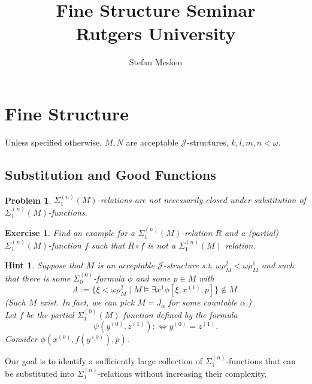\documentclass[12pt,a4paper]{article}
\theoremstyle{nicestyle}
\newtheorem{problem}{Problem}[subsection]
\newtheorem{hint}{Hint}[subsection]
\newtheorem{exercise}{Exercise}[subsection]
\begin{document}
\author{Stefan Mesken}
\title{Fine Structure Seminar \\
Rutgers University}
\maketitle

\setcounter{section}{0}
\section{Fine Structure}

Unless specified otherwise, $M,N$ are acceptable
$\mathcal{J}$-structures, $k,l,m,n < \omega$.

\setcounter{subsection}{7}
\subsection{Substitution and Good Functions}


\begin{problem}
  $\Sigma^{(n)}_1(M)$-relations are not necessarily closed under
  substitution of $\Sigma^{(n)}_1(M)$-functions.
\end{problem}

\begin{exercise}
  Find an example for a $\Sigma^{(n)}_1(M)$-relation $R$ and a
  (partial) $\Sigma^{(n)}_1(M)$-function $f$ such that $R \circ f$ is
  not a $\Sigma^{(n)}_1(M)$ relation.
\end{exercise}

\begin{hint}
  Suppose that $M$ is an acceptable $\mathcal{J}$-structure
  s.t. $\omega \rho^2_M < \omega \rho^1_M$ and such that there is some
  $\Sigma^{(0)}_0$-formula $\phi$ and some $p \in M$ with
  \[
    A := \{ \xi < \omega \rho^2_M \mid M \models \exists x^1 \phi [
    \xi, x^{(1)}, p ] \} \not \in M.
  \]
  (Such $M$ exist. In fact, we can pick $M = J_{\alpha}$ for some countable $\alpha$.) \\
  Let $f$ be the partial $\Sigma^{(0)}_1(M)$-function defined by the
  formula
  \[
    \psi(y^{(0)}, z^{(1)}) : \iff y^{(0)} = z^{(1)}.
  \]
 Consider $\phi(x^{(0)}, f(y^{(0)}), p)$.
\end{hint}

Our goal is to identify a sufficiently large collection of
$\Sigma^{(n)}_1$-functions that can be substituted into
$\Sigma^{(n)}_1$-relations without increasing their complexity.
\end{document}
